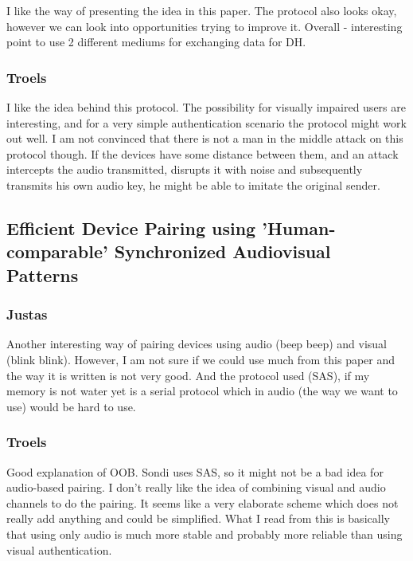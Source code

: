 \documentclass[12pt]{article}
\begin{document}
I like the way of presenting the idea in this paper. The protocol also looks okay, however we can look into opportunities trying to improve it.
Overall - interesting point to use 2 different mediums for exchanging data for DH.

\subsubsection{Troels}
\label{subs:Troels}

I like the idea behind this protocol. The possibility for visually impaired users are interesting, and for a very simple authentication scenario the protocol might work out well. I am not convinced that there is not a man in the middle attack on this protocol though. If the devices have some distance between them, and an attack intercepts the audio transmitted, disrupts it with noise and subsequently transmits his own audio key, he might be able to imitate the original sender.

\subsection{Efficient Device Pairing using 'Human-comparable' Synchronized Audiovisual Patterns}
\label{sub:Efficient Device Pairing using 'Human-comparable' Synchronized Audiovisual Patterns}

\subsubsection{Justas}
\label{subs:Justas}

Another interesting way of pairing devices using audio (beep beep) and visual (blink blink). However, I am not sure if we could use much from this paper and the way it is written is not very good. And the protocol used (SAS), if my memory is not water yet is a serial protocol which in audio (the way we want to use) would be hard to use.

\subsubsection{Troels}
\label{subs:Troels}

Good explanation of OOB. Sondi uses SAS, so it might not be a bad idea for audio-based pairing.
I don't really like the idea of combining visual and audio channels to do the pairing. It seems like a very elaborate scheme which does not really add anything and could be simplified.
What I read from this is basically that using only audio is much more stable and probably more reliable than using visual authentication. 
\end{document}
